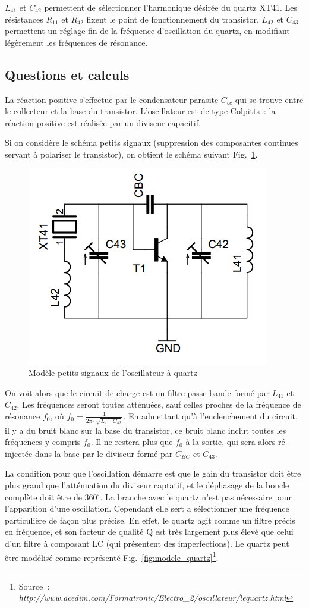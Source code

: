 \documentclass{article}
\begin{document}
$L_{41}$ et $C_{42}$ permettent de sélectionner l'harmonique désirée du quartz XT41. Les résistances $R_{11}$ et $R_{42}$ fixent le point de fonctionnement du transistor. $L_{42}$ et $C_{43}$ permettent un réglage fin de la fréquence d'oscillation du quartz, en modifiant légèrement les fréquences de résonance.



\subsection{Questions et calculs}


La réaction positive s'effectue par le condensateur parasite $C_{bc}$ qui se trouve entre le collecteur et la base du transistor.
L'oscillateur est de type Colpitts~: la réaction positive est réalisée par un diviseur capacitif.

Si on considère le schéma petits signaux (suppression des composantes continues servant à polariser le transistor), on obtient le schéma suivant Fig.~\ref{fig:osc_quartz_ac}.

\begin{figure}[h]
	\centering
	\includegraphics[width=0.4\linewidth]{shema_petit_signaux_oscillateur.png}
	\caption{Modèle petits signaux de l'oscillateur à quartz}
	\label{fig:osc_quartz_ac}
\end{figure}

On voit alors que le circuit de charge est un filtre passe-bande formé par $L_{41}$ et $C_{42}$. Les fréquences seront toutes atténuées, sauf celles proches de la fréquence de résonance $f_0$, où $f_0 = \frac{1}{2 \pi \cdot \sqrt{L_{41} \cdot C_{42}}}$.
En admettant qu'à l'enclenchement du circuit, il y a du bruit blanc sur la base du transistor, ce bruit blanc inclut toutes les fréquences y compris $f_0$. Il ne restera plus que $f_0$ à la sortie, qui sera alors ré-injectée dans la base par le diviseur formé par $C_{BC}$ et $C_{43}$.

La condition pour que l'oscillation démarre est que le gain du transistor doit être plus grand que l'atténuation du diviseur captatif, et le déphasage de la boucle complète doit être de $360^{ \circ }$. La branche avec le quartz n'est pas nécessaire pour l'apparition d'une oscillation. Cependant elle sert a sélectionner une fréquence particulière de façon plus précise. En effet, le quartz agit comme un filtre précis en fréquence, et son facteur de qualité Q est très largement plus élevé que celui d'un filtre à composant LC (qui présentent des imperfections). Le quartz peut être modélisé comme représenté Fig.~\ref{fig:modele_quartz}\footnote{Source~: \textit{http://www.acedim.com/Formatronic/Electro\_2/oscillateur/lequartz.html}}.
\end{document}
